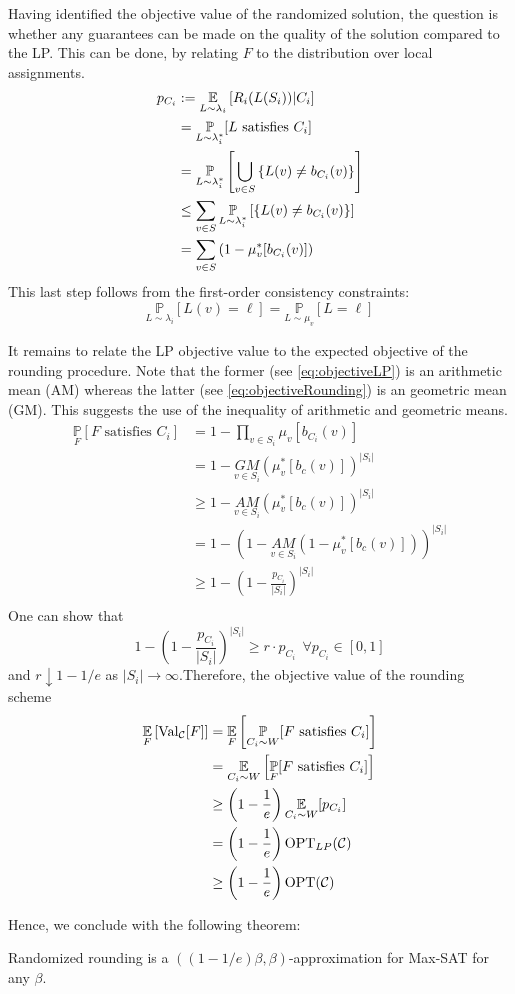 Having identified the objective value of the randomized solution, the question is whether any guarantees can be made on the quality of the solution compared to the LP. 
This can be done, by relating $F$ to the distribution over local assignments.
\begin{align}
	p_{C_i} &:=  \underset{L \sim \lambda_{i}}{\mathbb{E}} \left[ R_i( L (S_i )) |C_i \right]\nonumber\\
			&= \underset{L \sim \lambda_{i}^*}{\mathbb{P}} [L \text{ satisfies } C_i] \nonumber\\
			&=  \underset{L \sim \lambda_{i}^*}{\mathbb{P}}\left[ \bigcup_{v \in S} \left\{ L(v) \neq b_{C_i}(v) \right\} \right] \nonumber\\
			&\le \sum_{v \in  S } \underset{L \sim \lambda_{i}^*}{\mathbb{P}} \left[  \left\{ L(v) \neq b_{C_i}(v) \right\} \right] \nonumber\\
			&= \sum_{v \in S} \left( 1 - \mu_v^*[b_{C_i}(v)] \right) \label{eq:objectiveLP}
\end{align}
This last step follows from the first-order consistency constraints:
\[
	\underset{L \sim \lambda_{i} }{\mathbb{P}}[ L(v) = \ell] = \underset{L \sim \mu_v }{\mathbb{P}}[ L = \ell]
\]

It remains to relate the LP objective value to the expected objective of the rounding procedure. 
Note that the former (see \eqref{eq:objectiveLP}) is an arithmetic mean (AM) whereas the latter (see \eqref{eq:objectiveRounding}) is an geometric mean (GM). 
This suggests the use of the inequality of arithmetic and geometric means.
\begin{align*}
		\underset{F}{\mathbb{P}}[ F \text{ satisfies } C_i] &= 1 - \prod_{v \in S_i} \mu_v[b_{C_i}(v)]\\
		&= 1 - \underset{v \in S_i}{GM}(\mu_{v}^*[b_c(v)])^{|S_i|}\\
		&\ge 1 - \underset{v \in S_i}{AM}(\mu_{v}^*[b_c(v)])^{|S_i|}\\
		&= 1 - \left( 1  - \underset{v \in S_i}{AM}(1 -\mu_{v}^*[b_c(v)]) \right)^{|S_i|}\\
		&\ge 1 - \left( 1  - \frac{p_{C_i}}{|S_i|}\right)^{|S_i|}\\
\end{align*}
One can show that $$1 - \left( 1  - \frac{p_{C_i}}{|S_i|}\right)^{|S_i|} \geq r \cdot p_{C_i} ~\ \forall p_{C_i} \in [0, 1]$$ and $r \downarrow 1-1/e$ as $|S_i| \rightarrow \infty$.Therefore, the objective value of the rounding scheme
\begin{align*}
	\underset{F}{\mathbb{E}} \left[ \text{Val}_{\mathcal{C}}[F]\right] &= \underset{F}{\mathbb{E}}\left[ \underset{C_i \sim W}{\mathbb{P}}[ F \text{ satisfies } C_i] \right]\\
	&=  \underset{C_i \sim W}{\mathbb{E}}\left[ \underset{F}{\mathbb{P}}[ F \text{ satisfies } C_i] \right]\\
	&\ge \left( 1 - \frac{1}{e} \right) \underset{C_i \sim W}{\mathbb{E}} [ p_{C_i} ]\\
	&= \left( 1 - \frac{1}{e} \right) \text{OPT}_{LP}(\mathcal{C})\\
	&\ge \left( 1 - \frac{1}{e} \right) \text{OPT}(\mathcal{C})\\
\end{align*}

Hence, we conclude with the following theorem:
\begin{thm}
	Randomized rounding is a $\left( ( 1 - 1/e)\beta, \beta \right)$-approximation for Max-SAT for any $\beta$.
\end{thm}

